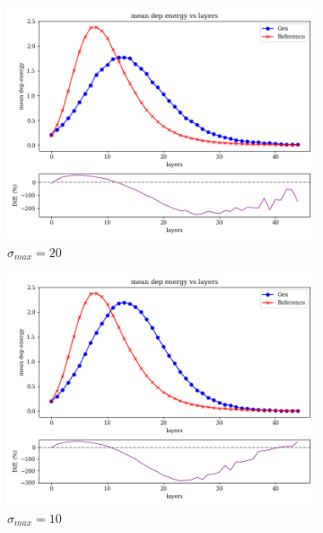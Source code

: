 \begin{figure}[bthp]
    \centering
    \begin{subfigure}[b]{0.23\textwidth}
        \centering
        \includegraphics[width=\textwidth]{Figures/ve20_3.png}
        \caption{$\sigma_{max}=20$}
        \label{fig:ve20_3}
    \end{subfigure}
    \hfill
    \begin{subfigure}[b]{0.23\textwidth}
        \centering
        \includegraphics[width=\textwidth]{Figures/ve10_3.png}
        \caption{$\sigma_{max}=10$}
        \label{fig:ve10_3}
    \end{subfigure}
    \hfill
    \begin{subfigure}[b]{0.23\textwidth}

\end{subfigure}
\end{figure}
